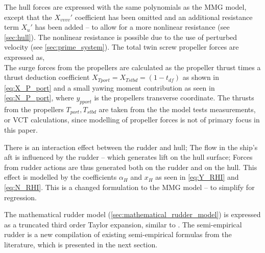 The hull forces are expressed with the same polynomials as the MMG model, except that the ${X_{vvvv}}'$ coefficient has been omitted and an additional resistance term ${X_u}'$ has been added -- to allow for a more nonlinear resistance (see \autoref{sec:hull}). The nonlinear resistance is possible due to the use of perturbed velocity (see \autoref{sec:prime_system}).
The total twin screw propeller forces are expressed as,
\begin{equation}
    \label{eq:X_P}
    
\end{equation}
%
\begin{equation}
    \label{eq:Y_P}
    
\end{equation}
%
\begin{equation}
    \label{eq:N_P}
    
\end{equation}
The surge forces from the propellers are calculated as the propeller thrust times a thrust deduction coefficient $X_{Tport}=X_{Tstbd}=(1-t_{df})$ as shown in \autoref{eq:X_P_port} and a small yawing moment contribution as seen in \autoref{eq:N_P_port}, where $y_{pport}$ is the propellers transverse coordinate. The thrusts from the propellers $T_{port},T_{stbd}$ are taken from the the model tests measurements, or VCT calculations, since modelling of propeller forces is not of primary focus in this paper.
\begin{equation}
    \label{eq:X_P_port}
    
\end{equation}
\begin{equation}
    \label{eq:N_P_port}
    
\end{equation}

There is an interaction effect between the rudder and hull; The flow in the ship's aft is influenced by the rudder -- which generates lift on the hull surface; Forces from rudder actions are thus generated both on the rudder and on the hull. This effect is modelled by the coefficients $\alpha_H$ and $x_H$ as seen in \autoref{eq:Y_RHI} and \autoref{eq:N_RHI}. This is a changed formulation to the MMG model -- to simplify for regression.
\begin{equation}
    \label{eq:Y_RHI}
    
\end{equation}
%
\begin{equation}
    \label{eq:N_RHI}
    
\end{equation}

The mathematical rudder model (\autoref{sec:mathematical_rudder_model}) is expressed as a truncated third order Taylor expansion, similar to \citet{abkowitz_ship_1964}. 
The semi-empirical rudder is a new compilation of existing semi-empirical formulas from the literature, which is presented in the next section.
